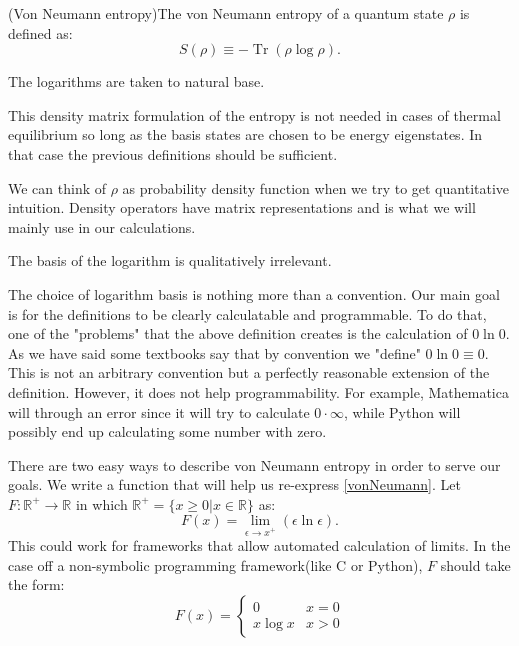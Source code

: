 \par
\begin{definition}(Von Neumann entropy)The von Neumann entropy of a quantum state $\rho$ is defined as:
\begin{equation}
S(\rho)\equiv -\operatorname{Tr}(\rho \log \rho).
\label{vonNeumann}
\end{equation}
\end{definition}
\begin{note}The logarithms are taken to natural base. 
\end{note}
\begin{note}
This density matrix formulation of the entropy is not needed in cases of thermal equilibrium so long as the basis states are chosen to be energy eigenstates. In that case the previous definitions should be sufficient.
\end{note}
We can think of $\rho$ as probability density function when we try to get quantitative intuition. Density operators have matrix representations and is what we will mainly use in our calculations.
\begin{note}The basis of the logarithm is qualitatively irrelevant.
\end{note}
The choice of logarithm basis is nothing more than a convention.
Our main goal is for the definitions to be clearly calculatable and programmable. To do that, one of the "problems" that the above definition creates is the calculation of $0 \ln 0$. As we have said some textbooks say that by convention we "define" $0 \ln 0 \equiv 0$. This is not an arbitrary convention but a perfectly reasonable extension of the definition. However, it does not help programmability. For example,  Mathematica will through an error since it will try to calculate $0 \cdot \infty$, while Python will possibly end up calculating some number with zero.
\par
There are two easy ways to describe von Neumann entropy in order to serve our goals. We write a function that will help us re-express \ref{vonNeumann}. Let $F: \mathbb{R}^{+} \rightarrow \mathbb{R}$ in which $\mathbb{R}^{+}= \{x \geq 0|x \in \mathbb{R} \} $ as:
\begin{equation}
F(x)=\lim_{\epsilon \to x^{+}}(\epsilon \ln \epsilon).
\label{prac_von}
\end{equation}
This could work for frameworks that allow automated calculation of limits. In the case off a non-symbolic programming framework(like C or Python), $F$ should take the form:
\begin{equation}
F(x)= 
 \begin{cases} 
      0 & x=0 \\
      x \log x & x > 0 
\end{cases}
\end{equation}
